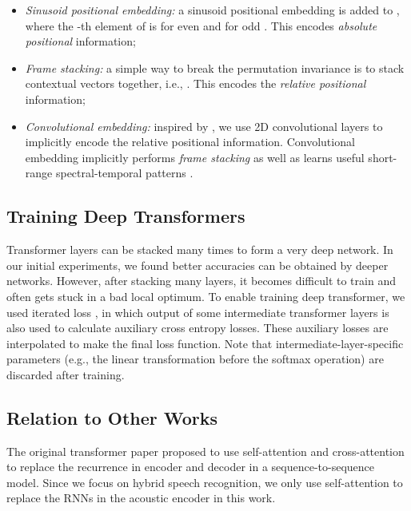 \documentclass{article}
\begin{document}
\begin{itemize}
    
    \item \emph{Sinusoid positional embedding:} a sinusoid positional embedding  is added to , where 
    the -th element of  is  for even  and  for odd . This encodes \emph{absolute positional} information;
    \item \emph{Frame stacking:} a simple way to break the permutation invariance is to stack  contextual vectors together, i.e., . This encodes the \emph{relative positional} information; 
    \item \emph{Convolutional  embedding:} inspired by \cite{mohamed2019transformers}, we use 2D convolutional layers to implicitly encode the relative positional information. Convolutional embedding implicitly performs \emph{frame stacking} as well as learns useful short-range spectral-temporal patterns \cite{zhang2017very}.
\end{itemize}



\subsection{Training Deep Transformers}
Transformer layers can be stacked many times to form a very deep network. In our initial experiments, we found better accuracies can be obtained by deeper networks. However, after stacking many layers, it becomes difficult to train and often gets stuck in a bad local optimum. To enable training deep transformer, we used iterated loss 
\cite{Andros2019}, in which output of some intermediate transformer layers is also used to calculate auxiliary cross entropy losses. These auxiliary losses are interpolated to make the final loss function. Note that intermediate-layer-specific parameters (e.g., the linear transformation before the softmax operation) are discarded after training. 

\subsection{Relation to Other Works}
\label{sec:relation}
The original transformer paper \cite{vaswani2017attention} proposed to use self-attention and cross-attention to replace the recurrence in encoder and decoder in a sequence-to-sequence model. Since we focus on hybrid speech recognition, we only use self-attention to replace the RNNs in the acoustic encoder in this work.
\end{document}
